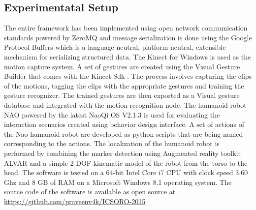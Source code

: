 \documentclass{llncs}
\begin{document}
\subsection{Experimentatal Setup}
The entire framework has been implemented using open network communication standards powered by ZeroMQ \cite{ZeroMQ} and message serialization is done using the Google Protocol Buffers \cite{ProtocolBuffers} which is a language-neutral, platform-neutral, extensible mechanism for serializing structured data. The Kinect for Windows is used as the motion capture system. A set of gestures are created using the Visual Gesture Builder that comes with the Kinect Sdk \cite{Kinect2014}. The process involves capturing the clips of the motions, tagging the clips with the appropriate gestures and training the gesture recognizer. The trained gestures are then exported as a Visual gesture database and integrated with the motion recognition node. The humanoid robot NAO powered by the latest NaoQi OS V2.1.3 is used for evaluating the interaction scenarios created using behavior design interface.  A set of actions of the Nao humanoid robot are developed as python scripts that are being named corresponding to the actions. The localization of the humanoid robot is performed by combining the marker detection using Augmented reality toolkit ALVAR \cite{ALVAR} and a simple 2-DOF kinematic model of the robot from the torso to the head. The software is tested on a 64-bit Intel Core i7 CPU with clock speed 3.60 Ghz and 8 GB of RAM on a  Microsoft Windows 8.1 operating system. The source code of the software is available as open source at \url{https://github.com/praveenv4k/ICSORO-2015}
\end{document}
